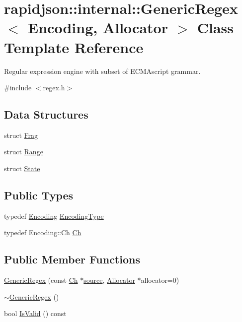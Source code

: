 \hypertarget{classrapidjson_1_1internal_1_1_generic_regex}{}\section{rapidjson\+::internal\+::Generic\+Regex$<$ Encoding, Allocator $>$ Class Template Reference}
\label{classrapidjson_1_1internal_1_1_generic_regex}


Regular expression engine with subset of E\+C\+M\+Ascript grammar.  




{\ttfamily \#include $<$regex.\+h$>$}

\subsection*{Data Structures}
\begin{DoxyCompactItemize}
\item 
struct \mbox{\hyperlink{structrapidjson_1_1internal_1_1_generic_regex_1_1_frag}{Frag}}
\item 
struct \mbox{\hyperlink{structrapidjson_1_1internal_1_1_generic_regex_1_1_range}{Range}}
\item 
struct \mbox{\hyperlink{structrapidjson_1_1internal_1_1_generic_regex_1_1_state}{State}}
\end{DoxyCompactItemize}
\subsection*{Public Types}
\begin{DoxyCompactItemize}
\item 
typedef \mbox{\hyperlink{classrapidjson_1_1_encoding}{Encoding}} \mbox{\hyperlink{classrapidjson_1_1internal_1_1_generic_regex_ac45239e5e5e2df52dcae5d117b1389c8}{Encoding\+Type}}
\item 
typedef Encoding\+::\+Ch \mbox{\hyperlink{classrapidjson_1_1internal_1_1_generic_regex_a14c4770316f826aa03ee393ec218fe3d}{Ch}}
\end{DoxyCompactItemize}
\subsection*{Public Member Functions}
\begin{DoxyCompactItemize}
\item 
\mbox{\hyperlink{classrapidjson_1_1internal_1_1_generic_regex_af02ff56acbfdd2191f98de551794d215}{Generic\+Regex}} (const \mbox{\hyperlink{classrapidjson_1_1internal_1_1_generic_regex_a14c4770316f826aa03ee393ec218fe3d}{Ch}} $\ast$\mbox{\hyperlink{namespacerapidjson_a37a3d95ab06aa7542487bb76e704885c}{source}}, \mbox{\hyperlink{classrapidjson_1_1_allocator}{Allocator}} $\ast$allocator=0)
\item 
\mbox{\hyperlink{classrapidjson_1_1internal_1_1_generic_regex_a3d67f06df7231596cb4a6135383836ec}{$\sim$\+Generic\+Regex}} ()
\item 
bool \mbox{\hyperlink{classrapidjson_1_1internal_1_1_generic_regex_a90863c80224069d8f064501d8a2584c0}{Is\+Valid}} () const
\end{DoxyCompactItemize}

